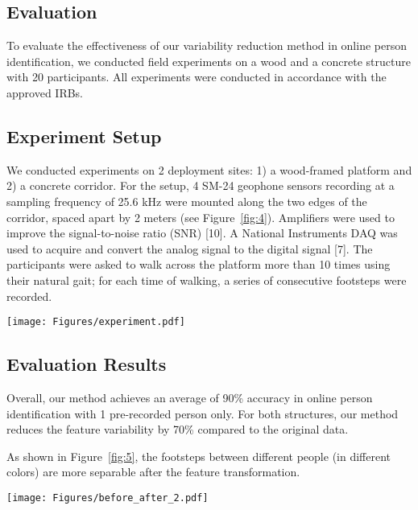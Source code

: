 \documentclass[11pt,letter]{article}
\begin{document}
\begin{multicols*}{2}
\vspace{-0.1in}
\section{Evaluation}
To evaluate the effectiveness of our variability reduction method in online person identification, we conducted field experiments on a wood and a concrete structure with 20 participants. All experiments were conducted in accordance with the approved IRBs.

\subsection{Experiment Setup}
We conducted experiments on 2 deployment sites: 1) a wood-framed platform and 2) a concrete corridor. For the setup, 4 SM-24 geophone sensors recording at a sampling frequency of 25.6 kHz were mounted along the two edges of the corridor, spaced apart by 2 meters (see Figure~\ref{fig:4}). Amplifiers were used to improve the signal-to-noise ratio (SNR) [10]. A National Instruments DAQ was used to acquire and convert the analog signal to the digital signal [7]. The participants were asked to walk across the platform more than 10 times using their natural gait; for each time of walking, a series of consecutive footsteps were recorded.

\texttt{[image: Figures/experiment.pdf]}
\label{fig:4}

\subsection{Evaluation Results}
Overall, our method achieves an average of 90\% accuracy in online person identification with 1 pre-recorded person only. For both structures, our method reduces the feature variability by 70\% compared to the original data. 

As shown in Figure~\ref{fig:5}, the footsteps between different people (in different colors) are more separable after the feature transformation.

 \texttt{[image: Figures/before\_after\_2.pdf]}
 \caption{2D t-SNE visualization of footstep features (a) before and (b) after variability reduction for 2 people.}\label{fig:5}


\end{multicols*}
\end{document}
